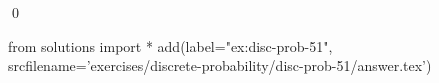 
\begin{ex} 
  \label{ex:disc-prob-51}
  
  \qed
\end{ex} 
\begin{python0}
from solutions import *
add(label="ex:disc-prob-51",
    srcfilename='exercises/discrete-probability/disc-prob-51/answer.tex') 
\end{python0}

